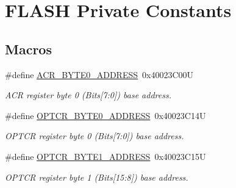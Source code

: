 \hypertarget{group___f_l_a_s_h___private___constants}{}\section{F\+L\+A\+SH Private Constants}
\label{group___f_l_a_s_h___private___constants}
\subsection*{Macros}
\begin{DoxyCompactItemize}
\item 
\mbox{\label{group___f_l_a_s_h___private___constants_gaeaca61fbcff69df08100280868bff214}} 
\#define \hyperlink{group___f_l_a_s_h___private___constants_gaeaca61fbcff69df08100280868bff214}{A\+C\+R\+\_\+\+B\+Y\+T\+E0\+\_\+\+A\+D\+D\+R\+E\+SS}~0x40023\+C00U
\begin{DoxyCompactList}\small\item\em A\+CR register byte 0 (Bits\mbox{[}7\+:0\mbox{]}) base address. \end{DoxyCompactList}\item 
\mbox{\label{group___f_l_a_s_h___private___constants_ga8223df020203a97af44e4b14e219d01e}} 
\#define \hyperlink{group___f_l_a_s_h___private___constants_ga8223df020203a97af44e4b14e219d01e}{O\+P\+T\+C\+R\+\_\+\+B\+Y\+T\+E0\+\_\+\+A\+D\+D\+R\+E\+SS}~0x40023\+C14U
\begin{DoxyCompactList}\small\item\em O\+P\+T\+CR register byte 0 (Bits\mbox{[}7\+:0\mbox{]}) base address. \end{DoxyCompactList}\item 
\mbox{\label{group___f_l_a_s_h___private___constants_ga3c08568a9b3a9d213a70eff8e87117ac}} 
\#define \hyperlink{group___f_l_a_s_h___private___constants_ga3c08568a9b3a9d213a70eff8e87117ac}{O\+P\+T\+C\+R\+\_\+\+B\+Y\+T\+E1\+\_\+\+A\+D\+D\+R\+E\+SS}~0x40023\+C15U
\begin{DoxyCompactList}\small\item\em O\+P\+T\+CR register byte 1 (Bits\mbox{[}15\+:8\mbox{]}) base address. \end{DoxyCompactList}\item 
\mbox{\label{group___f_l_a_s_h___private___constants_ga600e8029b876676da246a62924a294c7}} 

\end{DoxyCompactItemize}
